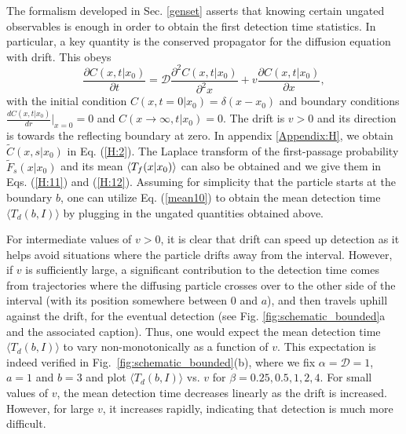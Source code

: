 The formalism developed in Sec. \ref{genset} asserts that knowing certain ungated observables is enough in order to obtain the first detection time statistics. In particular, a key quantity is the conserved propagator for the diffusion equation with drift. This obeys
%
\begin{equation} \label{drift}
    \frac{\partial C(x, t  | x_{0} )}{\partial t}=\mathcal{D} \frac{\partial^{2}C(x, t | x_{0})}{\partial^2 x} + v \frac{\partial  C(x, t | x_{0})}{\partial x},
\end{equation}
%
with the initial condition $C(x, t=0 | x_{0})=\delta\left(x-x_{0}\right)$ and boundary conditions $\frac{dC(x, t | x_{0})}{dr} \big|_{x=0} = 0$ and $C(x \to \infty, t  | x_{0} ) = 0$. The drift is $v>0$ and its direction is towards the reflecting boundary at zero. In appendix \ref{Appendix:H}, we obtain $ \widetilde{C}(x, s | x_{0})$ in Eq. (\ref{H:2}).  The Laplace transform of the first-passage probability $\widetilde{F}_s(x | x_{0})$ and its mean $\braket{T_f (x| x_{0})}$ can also be obtained and we give them in Eqs. (\ref{H:11}) and (\ref{H:12}). Assuming for simplicity that the particle starts at the boundary $b$, one can utilize Eq. (\ref{mean10}) to obtain the mean detection time $\langle T_d(b,I) \rangle$ by plugging in the ungated quantities obtained above.


For intermediate values of $v>0$, it is clear that drift can speed up detection as it helps avoid situations where the particle drifts away from the interval. However, if $v$ is sufficiently large, a significant contribution to the detection time comes from trajectories where the diffusing particle crosses over to the other side of the interval (with its position somewhere between $0$ and $a$), and then travels uphill against the drift, for the eventual detection (see Fig. \ref{fig:schematic_bounded}a and the associated caption). Thus, one would expect the mean detection time $\langle T_d(b,I) \rangle$ to vary non-monotonically as a function of $v$. This expectation is indeed verified in Fig.~\ref{fig:schematic_bounded}(b), where we fix $\alpha=\mathcal{D}=1$, $a=1$ and $b=3$ and plot $\langle T_d(b,I) \rangle$ vs. $v$ for $\beta=0.25, 0.5, 1, 2,4$. For small values of $v$,  the mean detection time decreases linearly as the drift is increased. However, for large $v$, it increases rapidly, indicating that detection is much more difficult. 

